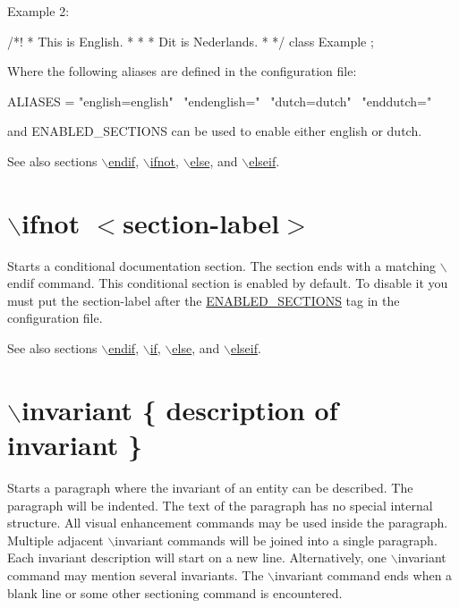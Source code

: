 \begin{DoxyParagraph}{Example 2:}
\begin{DoxyVerb}
/*! \english
 *  This is English.
 *  \endenglish
 *  \dutch
 *  Dit is Nederlands.
 *  \enddutch
 */
class Example
{
};
\end{DoxyVerb}

\end{DoxyParagraph}
Where the following aliases are defined in the configuration file:

\begin{DoxyVerb}
ALIASES  = "english=\if english" \
           "endenglish=\endif" \
           "dutch=\if dutch" \
           "enddutch=\endif"
\end{DoxyVerb}


and {\ttfamily ENABLED\_\-SECTIONS} can be used to enable either {\ttfamily english} or {\ttfamily dutch}.

\begin{DoxySeeAlso}{See also}
sections \hyperlink{commands_cmdendif}{$\backslash$endif}, \hyperlink{commands_cmdifnot}{$\backslash$ifnot}, \hyperlink{commands_cmdelse}{$\backslash$else}, and \hyperlink{commands_cmdelseif}{$\backslash$elseif}.
\end{DoxySeeAlso}


 \hypertarget{commands_cmdifnot}{}\section{$\backslash$ifnot $<$section-\/label$>$}\label{commands_cmdifnot}
 Starts a conditional documentation section. The section ends with a matching {\ttfamily $\backslash$endif} command. This conditional section is enabled by default. To disable it you must put the section-\/label after the \hyperlink{config_cfg_enabled_sections}{ENABLED\_\-SECTIONS} tag in the configuration file.

\begin{DoxySeeAlso}{See also}
sections \hyperlink{commands_cmdendif}{$\backslash$endif}, \hyperlink{commands_cmdif}{$\backslash$if}, \hyperlink{commands_cmdelse}{$\backslash$else}, and \hyperlink{commands_cmdelseif}{$\backslash$elseif}.
\end{DoxySeeAlso}


 \hypertarget{commands_cmdinvariant}{}\section{$\backslash$invariant \{ description of invariant \}}\label{commands_cmdinvariant}
 Starts a paragraph where the invariant of an entity can be described. The paragraph will be indented. The text of the paragraph has no special internal structure. All visual enhancement commands may be used inside the paragraph. Multiple adjacent $\backslash$invariant commands will be joined into a single paragraph. Each invariant description will start on a new line. Alternatively, one $\backslash$invariant command may mention several invariants. The $\backslash$invariant command ends when a blank line or some other sectioning command is encountered.



